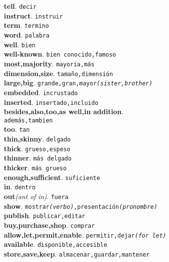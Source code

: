 \documentclass[twocolumn]{article}
\begin{document}
	\textsf{\textbf{tell}}. \texttt{decir}\\
	\textsf{\textbf{instruct}}. \texttt{instruir}\\
	\textsf{\textbf{term}}. \texttt{termino}\\
	\textsf{\textbf{word}}. \texttt{palabra}\\
	\textsf{\textbf{well}}. \texttt{bien}\\
	\textsf{\textbf{well-known}}. \texttt{bien conocido,famoso}\\
	\textsf{\textbf{most,majority}}. \texttt{mayoria,m\'as}\\
	\textsf{\textbf{dimension,size}}. \texttt{tama\~no,dimensi\'on}\\
	\textsf{\textbf{large,big}}. \texttt{grande,gran,mayor{\scriptsize \textsl{(sister,brother)}}}\\
	\textsf{\textbf{embedded}}. \texttt{incrustado}\\
	\textsf{\textbf{inserted}}. \texttt{insertado,incluido}\\
	\textsf{\textbf{besides,also,too,as well,in addition}}.\\\texttt{adem\'as,tambien}\\
	\textsf{\textbf{too}}. \texttt{tan}\\
	\textsf{\textbf{thin,skinny}}. \texttt{delgado}\\
	\textsf{\textbf{thick}}. \texttt{grueso,espeso}\\
	\textsf{\textbf{thinner}}. \texttt{m\'as delgado}\\
	\textsf{\textbf{thicker}}. \texttt{m\'as grueso}\\
	\textsf{\textbf{enough,sufficient}}. \texttt{suficiente}\\
	\textsf{\textbf{in}}. \texttt{dentro}\\
	\textsf{\textbf{out}}{\scriptsize \textsl{(ant of in)}}. \texttt{fuera}\\
	\textsf{\textbf{show}}. \texttt{mostrar{\scriptsize \textsl{(verbo)}},presentaci\'on{\scriptsize \textsl{(pronombre)}}}\\
	\textsf{\textbf{publish}}. \texttt{publicar,editar}\\
	\textsf{\textbf{buy,purchase,shop}}. \texttt{comprar}\\
	\textsf{\textbf{allow,let,permit,enable}}. \texttt{permitir,dejar{\scriptsize \textsl{(for let)}}}\\
	\textsf{\textbf{available}}. \texttt{disponible,accesible}\\
	\textsf{\textbf{store,save,keep}}. \texttt{almacenar,guardar,mantener}\\
\end{document}
